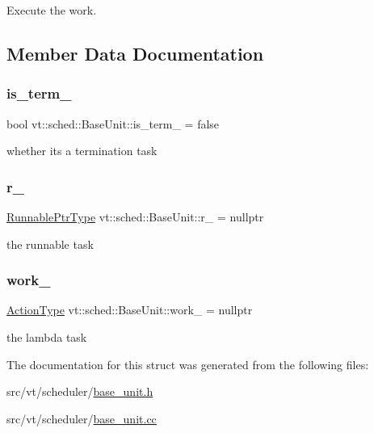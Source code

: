Execute the work. 



\subsection{Member Data Documentation}
\mbox{\label{structvt_1_1sched_1_1_base_unit_a5aab7332c91c6ccdc76bdb55de9cc502}} 
\subsubsection{\texorpdfstring{is\+\_\+term\+\_\+}{is\_term\_}}
{\footnotesize\ttfamily bool vt\+::sched\+::\+Base\+Unit\+::is\+\_\+term\+\_\+ = false\hspace{0.3cm}{\ttfamily [protected]}}

whether it\textquotesingle{}s a termination task \mbox{\label{structvt_1_1sched_1_1_base_unit_a0d126796f0ee5a8e0f3304e6ca02d0fc}} 
\subsubsection{\texorpdfstring{r\+\_\+}{r\_}}
{\footnotesize\ttfamily \hyperlink{structvt_1_1sched_1_1_base_unit_a9be5d5adaeb011c8ef82f751485ebf9a}{Runnable\+Ptr\+Type} vt\+::sched\+::\+Base\+Unit\+::r\+\_\+ = nullptr\hspace{0.3cm}{\ttfamily [protected]}}

the runnable task \mbox{\label{structvt_1_1sched_1_1_base_unit_ab425435c3b6c1cdf2fc208f1e50ea84c}} 
\subsubsection{\texorpdfstring{work\+\_\+}{work\_}}
{\footnotesize\ttfamily \hyperlink{namespacevt_ae0a5a7b18cc99d7b732cb4d44f46b0f3}{Action\+Type} vt\+::sched\+::\+Base\+Unit\+::work\+\_\+ = nullptr\hspace{0.3cm}{\ttfamily [protected]}}

the lambda task 

The documentation for this struct was generated from the following files\+:\begin{DoxyCompactItemize}
\item 
src/vt/scheduler/\hyperlink{base__unit_8h}{base\+\_\+unit.\+h}\item 
src/vt/scheduler/\hyperlink{base__unit_8cc}{base\+\_\+unit.\+cc}\end{DoxyCompactItemize}

